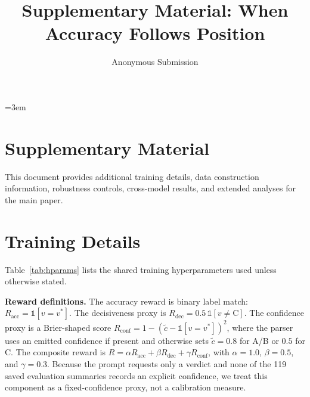 \documentclass[letterpaper]{article}
\title{Supplementary Material: When Accuracy Follows Position}
\author{Anonymous Submission}
\begin{document}
\emergencystretch=3em
\maketitle

\section*{Supplementary Material}
This document provides additional training details, data construction information, robustness controls, cross-model results, and extended analyses for the main paper.

\appendix
\section{Training Details}
\label{app:training}

Table~\ref{tab:hparams} lists the shared training hyperparameters used unless otherwise stated.

\textbf{Reward definitions.} The accuracy reward is binary label match: $R_{\text{acc}} = \mathbb{1}[v = v^*]$. The decisiveness proxy is $R_{\text{dec}} = 0.5\,\mathbb{1}[v \neq \mathrm{C}]$. The confidence proxy is a Brier-shaped score $R_{\text{conf}} = 1-(\tilde c-\mathbb{1}[v=v^*])^2$, where the parser uses an emitted confidence if present and otherwise sets $\tilde c=0.8$ for A/B or $0.5$ for C. The composite reward is $R = \alpha R_{\text{acc}} + \beta R_{\text{dec}} + \gamma R_{\text{conf}}$, with $\alpha=1.0$, $\beta=0.5$, and $\gamma=0.3$. Because the prompt requests only a verdict and none of the 119 saved evaluation summaries records an explicit confidence, we treat this component as a fixed-confidence proxy, not a calibration measure.
\end{document}
